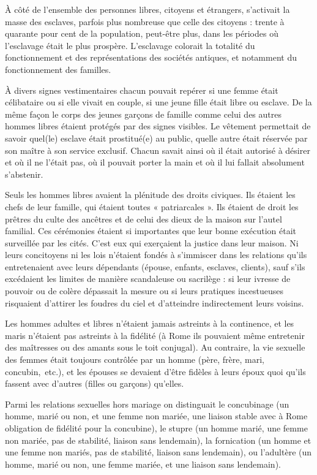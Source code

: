 À côté de l'ensemble des personnes libres, citoyens et étrangers,
s'activait la masse des esclaves, parfois plus nombreuse que celle des citoyens :
 trente à quarante pour cent de la population, peut-être plus, dans
les périodes où l'esclavage était le plus prospère. L'esclavage colorait la
totalité du fonctionnement et des représentations des sociétés antiques,
et notamment du fonctionnement des familles.

À divers signes vestimentaires chacun pouvait repérer si une
femme était célibataire ou si elle vivait en couple, si une jeune fille était
libre ou esclave. De la même façon le corps des jeunes garçons de famille
comme celui des autres hommes libres étaient protégés par des signes visibles.
Le vêtement permettait de savoir quel(le) esclave était prostitué(e)
au public, quelle autre était réservée par son maître à son service exclusif.
Chacun savait ainsi où il était autorisé à désirer et où il ne l'était pas, où il
pouvait porter la main et où il lui fallait absolument s'abstenir.

Seuls les hommes libres avaient la plénitude des droits civiques. Ils
étaient les chefs de leur famille, qui étaient toutes « patriarcales ».
Ils étaient de droit les prêtres du culte des ancêtres et de celui des dieux
de la maison sur l'autel familial. Ces cérémonies étaient si importantes
que leur bonne exécution était surveillée par les cités. C'est eux qui exerçaient
la justice dans leur maison. Ni leurs concitoyens ni les lois
n'étaient fondés à s'immiscer dans les relations qu'ils entretenaient avec
leurs dépendants (épouse, enfants, esclaves, clients), sauf s'ils excédaient
les limites de manière scandaleuse ou sacrilège : si leur ivresse de pouvoir
ou de colère dépassait la mesure  ou si leurs pratiques incestueuses
risquaient d'attirer les foudres du ciel et d'atteindre indirectement leurs
voisins.

Les hommes adultes et libres n'étaient jamais astreints à la continence,
et les maris n'étaient pas astreints à la fidélité (à Rome ils pouvaient
même entretenir des maîtresses ou des amants sous le toit conjugal).
Au contraire, la vie sexuelle des femmes était toujours contrôlée par
un homme (père, frère, mari, concubin,~etc.), et les épouses se devaient
d'être fidèles à leurs époux quoi qu'ils fassent avec d'autres (filles ou garçons)
qu'elles.

Parmi les relations sexuelles hors mariage on distinguait le concubinage (un homme, marié ou non, et une
femme non mariée, une liaison stable avec à Rome obligation de fidélité pour la concubine), le stupre (un homme 
marié, une femme non mariée, pas de stabilité, liaison sans lendemain), la fornication (un homme et une femme 
non mariés, pas de stabilité, liaison sans lendemain), ou l'adultère (un homme, marié ou non, une femme mariée, 
et une liaison sans lendemain).

